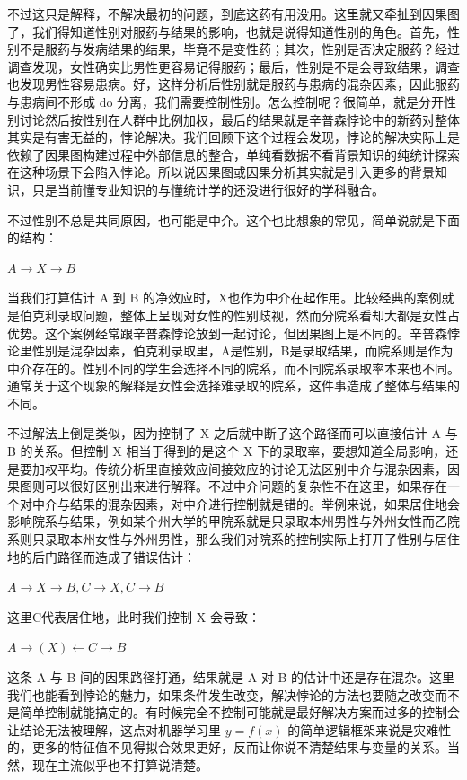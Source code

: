 \documentclass[]{tufte-book}
\begin{document}
不过这只是解释，不解决最初的问题，到底这药有用没用。这里就又牵扯到因果图了，我们得知道性别对服药与结果的影响，也就是说得知道性别的角色。首先，性别不是服药与发病结果的结果，毕竟不是变性药；其次，性别是否决定服药？经过调查发现，女性确实比男性更容易记得服药；最后，性别是不是会导致结果，调查也发现男性容易患病。好，这样分析后性别就是服药与患病的混杂因素，因此服药与患病间不形成 do 分离，我们需要控制性别。怎么控制呢？很简单，就是分开性别讨论然后按性别在人群中比例加权，最后的结果就是辛普森悖论中的新药对整体其实是有害无益的，悖论解决。我们回顾下这个过程会发现，悖论的解决实际上是依赖了因果图构建过程中外部信息的整合，单纯看数据不看背景知识的纯统计探索在这种场景下会陷入悖论。所以说因果图或因果分析其实就是引入更多的背景知识，只是当前懂专业知识的与懂统计学的还没进行很好的学科融合。

不过性别不总是共同原因，也可能是中介。这个也比想象的常见，简单说就是下面的结构：

\(A \rightarrow X \rightarrow B\)

当我们打算估计 A 到 B 的净效应时，X也作为中介在起作用。比较经典的案例就是伯克利录取问题，整体上呈现对女性的性别歧视，然而分院系看却大都是女性占优势。这个案例经常跟辛普森悖论放到一起讨论，但因果图上是不同的。辛普森悖论里性别是混杂因素，伯克利录取里，A是性别，B是录取结果，而院系则是作为中介存在的。性别不同的学生会选择不同的院系，而不同院系录取率本来也不同。通常关于这个现象的解释是女性会选择难录取的院系，这件事造成了整体与结果的不同。

不过解法上倒是类似，因为控制了 X 之后就中断了这个路径而可以直接估计 A 与 B 的关系。但控制 X 相当于得到的是这个 X 下的录取率，要想知道全局影响，还是要加权平均。传统分析里直接效应间接效应的讨论无法区别中介与混杂因素，因果图则可以很好区别出来进行解释。不过中介问题的复杂性不在这里，如果存在一个对中介与结果的混杂因素，对中介进行控制就是错的。举例来说，如果居住地会影响院系与结果，例如某个州大学的甲院系就是只录取本州男性与外州女性而乙院系则只录取本州女性与外州男性，那么我们对院系的控制实际上打开了性别与居住地的后门路径而造成了错误估计：

\(A \rightarrow X\rightarrow B, C \rightarrow X, C \rightarrow B\)

这里C代表居住地，此时我们控制 X 会导致：

\(A \rightarrow (X) \leftarrow C \rightarrow B\)

这条 A 与 B 间的因果路径打通，结果就是 A 对 B 的估计中还是存在混杂。这里我们也能看到悖论的魅力，如果条件发生改变，解决悖论的方法也要随之改变而不是简单控制就能搞定的。有时候完全不控制可能就是最好解决方案而过多的控制会让结论无法被理解，这点对机器学习里 \(y = f(x)\) 的简单逻辑框架来说是灾难性的，更多的特征值不见得拟合效果更好，反而让你说不清楚结果与变量的关系。当然，现在主流似乎也不打算说清楚。
\end{document}
